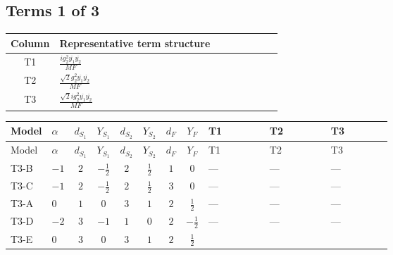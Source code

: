 \documentclass[8pt]{article}
\begin{document}
\begin{landscape}
\subsection*{Terms 1 of 3}
\begin{center}
\begin{tabular}{@{}c >{\raggedright\arraybackslash}p{0.82\linewidth}@{}}
\toprule
Column & Representative term structure \\
\midrule
T1 & \(\displaystyle \frac{i g_{2}^{2} \overline{y_{1}} \overline{y_{2}}}{MF}\) \\
\midrule
T2 & \(\displaystyle \frac{\sqrt{2} g_{2}^{2} \overline{y_{1}} \overline{y_{2}}}{MF}\) \\
\midrule
T3 & \(\displaystyle \frac{\sqrt{2} i g_{2}^{2} \overline{y_{1}} \overline{y_{2}}}{MF}\) \\
\midrule
\bottomrule
\end{tabular}
\end{center}
\smallskip
\tiny
\begin{longtable}{@{}llcccccc >{\raggedright\arraybackslash}p{0.21\linewidth} >{\raggedright\arraybackslash}p{0.21\linewidth} >{\raggedright\arraybackslash}p{0.21\linewidth}@{}}
\toprule
Model & $\alpha$ & $d_{S_1}$ & $Y_{S_1}$ & $d_{S_2}$ & $Y_{S_2}$ & $d_F$ & $Y_F$ & T1 & T2 & T3 \\
\midrule
\endfirsthead
\toprule
Model & $\alpha$ & $d_{S_1}$ & $Y_{S_1}$ & $d_{S_2}$ & $Y_{S_2}$ & $d_F$ & $Y_F$ & T1 & T2 & T3 \\
\midrule
\endhead
T3-B & $-1$ & $2$ & $-\frac{1}{2}$ & $2$ & $\frac{1}{2}$ & $1$ & $0$ & --- & --- & --- \\
\midrule
T3-C & $-1$ & $2$ & $-\frac{1}{2}$ & $2$ & $\frac{1}{2}$ & $3$ & $0$ & --- & --- & --- \\
\midrule
T3-A & $0$ & $1$ & $0$ & $3$ & $1$ & $2$ & $\frac{1}{2}$ & --- & --- & --- \\
\midrule
T3-D & $-2$ & $3$ & $-1$ & $1$ & $0$ & $2$ & $-\frac{1}{2}$ & --- & --- & --- \\
\midrule
T3-E & $0$ & $3$ & $0$ & $3$ & $1$ & $2$ & $\frac{1}{2}$ & \scriptsize\adjustbox{max width=\linewidth}{$\begin{gathered} - \frac{i g_{2}^{2} \overline{y_{1}} \overline{y_{2}}}{MF}\end{gathered}$} & \scriptsize\adjustbox{max width=\linewidth}{$\begin{gathered} \frac{\sqrt{2} g_{2}^{2} \overline{y_{1}} \overline{y_{2}}}{4 MF}\end{gathered}$} & \scriptsize\adjustbox{max width=\linewidth}{$\begin{gathered} - \frac{49 \sqrt{2} i g_{2}^{2} \overline{y_{1}} \overline{y_{2}}}{16 MF}\end{gathered}$} \\
\midrule
\bottomrule
\end{longtable}
\clearpage

\end{landscape}
\end{document}
